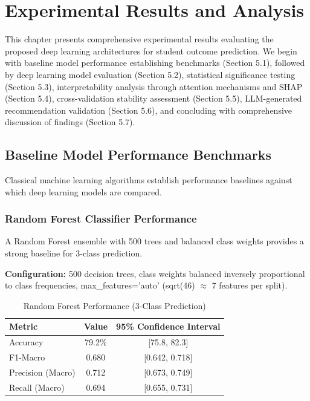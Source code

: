 \chapter{Experimental Results and Analysis}

This chapter presents comprehensive experimental results evaluating the proposed deep learning architectures for student outcome prediction. We begin with baseline model performance establishing benchmarks (Section 5.1), followed by deep learning model evaluation (Section 5.2), statistical significance testing (Section 5.3), interpretability analysis through attention mechanisms and SHAP (Section 5.4), cross-validation stability assessment (Section 5.5), LLM-generated recommendation validation (Section 5.6), and concluding with comprehensive discussion of findings (Section 5.7).

\section{Baseline Model Performance Benchmarks}

Classical machine learning algorithms establish performance baselines against which deep learning models are compared.

\subsection{Random Forest Classifier Performance}

A Random Forest ensemble with 500 trees and balanced class weights provides a strong baseline for 3-class prediction.

\textbf{Configuration:} 500 decision trees, class weights balanced inversely proportional to class frequencies, max\_features='auto' (sqrt(46) $\approx$ 7 features per split).

\begin{table}[h]
\centering
\caption{Random Forest Performance (3-Class Prediction)}
\label{tab:rf_perf}
\begin{tabular}{lcc}
\toprule
\textbf{Metric} & \textbf{Value} & \textbf{95\% Confidence Interval} \\
\midrule
Accuracy & 79.2\% & [75.8, 82.3] \\
F1-Macro & 0.680 & [0.642, 0.718] \\
Precision (Macro) & 0.712 & [0.673, 0.749] \\
Recall (Macro) & 0.694 & [0.655, 0.731] \\
\bottomrule
\end{tabular}
\end{table}


